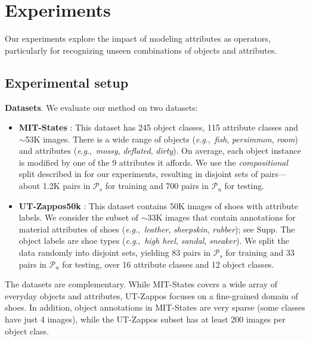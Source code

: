 \documentclass[runningheads]{llncs}
\newcommand{\eg}{\textit{e}.\textit{g}.,~}
\begin{document}
\section{Experiments}\label{sec:results}

Our experiments explore the impact of modeling attributes as operators, particularly for recognizing unseen combinations of objects and attributes.

\vspace*{-0.1in}
\subsection{Experimental setup}

\noindent\textbf{Datasets}. We evaluate our method on two datasets:

\begin{itemize}
\item \textbf{MIT-States} \cite{isola2015discovering}: This dataset has 245 object classes, 115 attribute classes and
$\sim$53K images.  There is a wide range of objects (\eg \emph{fish}, \emph{persimmon}, \emph{room}) and attributes (\eg \emph{mossy}, \emph{deflated}, \emph{dirty}). On average, each object instance is modified by one of the 9 attributes it affords. We use the \emph{compositional} split described in \cite{misra2017red} for our experiments, resulting in disjoint sets of pairs---about 1.2K pairs in $\mathcal{P}_s$ for training and 700 pairs in $\mathcal{P}_u$ for testing. 
\vspace*{0.1in}

\item \textbf{UT-Zappos50k} \cite{yu2017semantic}: This dataset contains 50K images of shoes with attribute labels. We consider the subset of $\sim$33K images that contain annotations for material attributes of shoes (\eg \emph{leather}, \emph{sheepskin}, \emph{rubber}); see Supp.  
The object labels are shoe types (\eg \emph{high heel}, \emph{sandal}, \emph{sneaker}). 
We split the data randomly into disjoint sets, yielding 83 pairs in $\mathcal{P}_s$ for training and 33 pairs in $\mathcal{P}_u$ for testing, over 16 attribute classes and 12 object classes.\end{itemize}

The datasets are complementary.  While MIT-States covers a wide array of everyday objects and attributes, UT-Zappos focuses on a fine-grained domain of shoes. In addition, object annotations in MIT-States are very sparse (some classes have just 4 images), while the UT-Zappos subset has at least 200 images per object class. 
\end{document}
